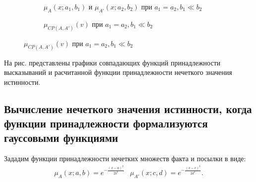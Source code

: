 \begin{itemize}
\begin{figure}[ht]
	\newcommand{\aOne}{0.5}
	\newcommand{\bOne}{0.05}
	\newcommand{\aTwo}{0.5}
	\newcommand{\bTwo}{0.05}
	\begin{subfigure}[t]{0.5\textwidth}
		\caption{$\mu_A(x; a_1, b_1)$ и $\mu_{A'}(x; a_2, b_2)$ при $a_1 = a_2, b_1 \ll b_2$}
	\end{subfigure}
	\begin{subfigure}[t]{0.5\textwidth}
		\caption{$\mu_{CP(A,A')}(v)$ при $a_1 = a_2, b_1 \ll b_2$}
	\end{subfigure}
	\label{fig:ftv-gauss-quazi-false}
\end{figure}

На рис. представлены графики совпадающих функций принадлежности высказываний и расчитанной функции принадлежности нечеткого значения истинности.
\end{itemize}

\subsection{Вычисление нечеткого значения истинности, когда функции принадлежности формализуются гауссовыми функциями}

Зададим функции принадлежности нечетких множеств факта и посылки в виде:
\begin{equation*}
\begin{aligned}
\mu_{A}(x; a, b) = e^{-\frac{(x-a)^2}{2b^2}} & \mu_{A'}(x; c, d) = e^{-\frac{(x-c)^2}{2d^2}}. \\
\end{aligned}
\end{equation*}

